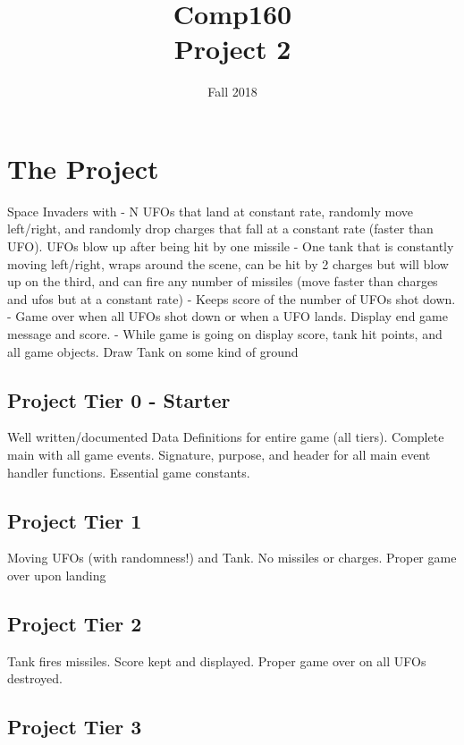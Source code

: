 \documentclass[nobib]{tufte-handout}
\title{Comp160 \\ Project 2 }
\author{}
\date{ Fall 2018 }
\begin{document}
\maketitle

\section*{The Project}

Space Invaders with
 - N UFOs that land at constant rate, randomly move left/right, and randomly drop charges that
    fall at a constant rate (faster than UFO). UFOs blow up after being hit by one missile
 - One tank that is constantly moving left/right, wraps around the scene, can be hit by 2 charges but
   will blow up on the third, and can fire any number of missiles (move faster than charges and
   ufos but at a constant rate)
 - Keeps score of the number of UFOs shot down.
 - Game over when all UFOs shot down or when a UFO lands. Display end game message and score.
 - While game is going on display score, tank hit points, and all game objects. Draw Tank on some kind
   of ground



\subsection*{Project Tier 0 - Starter}

Well written/documented Data Definitions for entire game (all tiers). Complete main with all game events.
Signature, purpose, and header for all main event handler functions. Essential
game constants.

\subsection*{Project Tier 1}

Moving UFOs (with randomness!) and Tank. No missiles or charges. Proper game over upon
landing

\subsection*{Project Tier 2}

Tank fires missiles. Score kept and displayed. Proper game over on all UFOs destroyed.

\subsection*{Project Tier 3}
\end{document}
